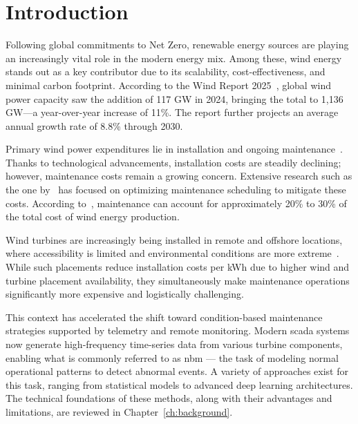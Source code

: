 
\chapter{Introduction}
\label{ch:introduction}

\ifpdf
    \graphicspath{{1_introduction/figures/PNG/}{1_introduction/figures/PDF/}{1_introduction/figures/}}
\else
    \graphicspath{{1_introduction/figures/EPS/}{1_introduction/figures/}}
\fi


Following global commitments to Net Zero, renewable energy sources are playing an increasingly vital role in the modern energy mix.
Among these, wind energy stands out as a key contributor due to its scalability, cost-effectiveness, and minimal carbon footprint.
According to the Wind Report 2025~\citep{henrique_global_nodate}, global wind power capacity saw the addition of 117 GW in 2024, bringing the total to 1,136 GW—a year-over-year increase of 11\%.
The report further projects an average annual growth rate of 8.8\% through 2030.

Primary wind power expenditures lie in installation and ongoing maintenance~\citep{charabi_wind_2020}. 
Thanks to technological advancements, installation costs are steadily declining; however, maintenance costs remain a growing concern.
Extensive research such as the one by~\cite{yang_operations_2021} has focused on optimizing maintenance scheduling to mitigate these costs.
According to~\citep{dao_wind_2019}, maintenance can account for approximately 20\% to 30\% of the total cost of wind energy production.

Wind turbines are increasingly being installed in remote and offshore locations, where accessibility is limited and environmental conditions are more extreme~\citep{henrique_global_nodate}.
While such placements reduce installation costs per kWh due to higher wind and turbine placement availability, they simultaneously make maintenance operations significantly more expensive and logistically challenging.

This context has accelerated the shift toward condition-based maintenance strategies supported by telemetry and remote monitoring. 
Modern \gls{scada} systems now generate high-frequency time-series data from various turbine components, enabling what is commonly referred to as \gls{nbm} — the task of modeling normal operational patterns to detect abnormal events.
A variety of approaches exist for this task, ranging from statistical models to advanced deep learning architectures.
The technical foundations of these methods, along with their advantages and limitations, are reviewed in Chapter~\ref{ch:background}.


